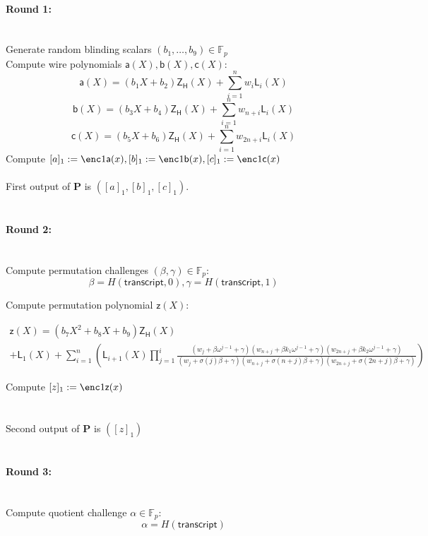 \documentclass[11pt]{article} %
\newcommand{\F}{\ensuremath{\mathbb F}\xspace}
\newcommand{\prv}{\ensuremath{\mathsf{\mathbf{P}}}\xspace}
\newcommand{\ZeroH}{\ensuremath{Z_{H}} \xspace}
\newcommand{\lpoly}{\ensuremath{\mathsf{a}}\xspace}
\newcommand{\rpoly}{\ensuremath{\mathsf{b}}\xspace}
\newcommand{\opoly}{\ensuremath{\mathsf{c}}\xspace}
\newcommand{\idpermpoly}{\ensuremath{\mathsf{z}}\xspace}
\newcommand{\lagrangepoly}{\ensuremath{\mathsf{L}}\xspace}
\newcommand{\zeropoly}{\ensuremath{\mathsf{\ZeroH}}\xspace}
\newcommand{\snark}{\ensuremath{\mathsf{snark(\lambda)}}\xspace}
\newcommand{\Prove}{\mathcal{P}}
\newcommand{\Psnark}{\prv}%
\newcommand{\transcript}{\ensuremath{\mathsf{transcript}}\xspace}
\begin{document}
	\paragraph{\textbf{Round 1:}} \ \\
	Generate random blinding scalars $(b_1, \ldots, b_{9}) \in \F_p$ \\
	Compute wire polynomials $\lpoly(X), \rpoly(X), \opoly(X):$
	$$
	\lpoly(X) = (b_1X + b_2)\zeropoly(X) + \sum_{i=1}^nw_i\lagrangepoly_i(X)
	$$
	$$
	\rpoly(X) = (b_3X + b_4)\zeropoly(X) + \sum_{i=1}^nw_{n+i}\lagrangepoly_i(X)
	$$
	$$
	\opoly(X) = (b_5X + b_6)\zeropoly(X) + \sum_{i=1}^nw_{2n+i}\lagrangepoly_i(X)
	$$
	Compute $[a]_1 := \enc1{\lpoly(x)}, [b]_1 := \enc1{\rpoly(x)}, [c]_1 := \enc1{\opoly(x)}$
	\\ \\
	First output of $\Psnark$ is $([a]_1, [b]_1, [c]_1)$.
	\\ \\
	\noindent
	\paragraph{\textbf{Round 2:}} \ \\
	Compute permutation challenges $(\beta, \gamma) \in \F_p:$ \[\beta = H(\transcript,0), \gamma = H(\transcript, 1) \]
	
Compute permutation polynomial $\idpermpoly(X):$
	\begin{adjustwidth}{-50mm}{-50mm}
	$$
	\begin{array}{c}
	\idpermpoly(X) = (b_7X^2 + b_8X + b_9)\zeropoly(X) \\
	+ \lagrangepoly_1(X) + \sum_{i=1}^{n} \left(
	\lagrangepoly_{i+1}(X) \prod_{j=1}^i\frac{(w_j + \beta \omega^{j-1} + \gamma)(w_{n+j} + \beta k_1 \omega^{j-1} + \gamma)(w_{2n + j} + \beta k_2 \omega^{j-1} + \gamma)}{(w_j + \sigma(j)\beta + \gamma)(w_{n+j} + \sigma(n+j)\beta + \gamma)(w_{2n+j} + \sigma(2n+j)\beta + \gamma)}
	\right)
	\end{array}
	$$
	\end{adjustwidth}
	Compute $[z]_1 := \enc1{\idpermpoly(x)}$ \\
	\\ \\
	Second output of $\Psnark$ is $([z]_1)$
	\\ \\
	\noindent
	\paragraph{\textbf{Round 3:}} \ \\
	Compute quotient challenge $\alpha \in \F_p:$ \[ \alpha = H(\transcript) \]
\end{document}
